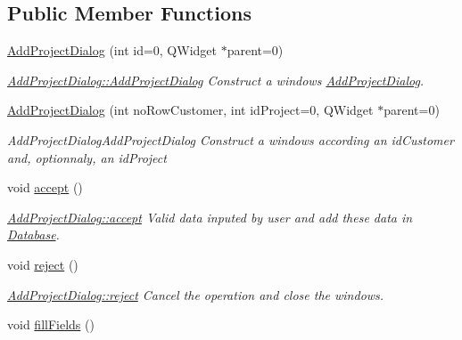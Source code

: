 \subsection*{Public Member Functions}
\begin{DoxyCompactItemize}
\item 
\hyperlink{classAddProjectDialog_abb96542ad074344f634d0ff834e65f03}{Add\+Project\+Dialog} (int id=0, Q\+Widget $\ast$parent=0)
\begin{DoxyCompactList}\small\item\em \hyperlink{classAddProjectDialog_abb96542ad074344f634d0ff834e65f03}{Add\+Project\+Dialog\+::\+Add\+Project\+Dialog} Construct a windows \hyperlink{classAddProjectDialog}{Add\+Project\+Dialog}. \end{DoxyCompactList}\item 
\hyperlink{classAddProjectDialog_a7acdb6d0e61449ad9376802d90162d2c}{Add\+Project\+Dialog} (int no\+Row\+Customer, int id\+Project=0, Q\+Widget $\ast$parent=0)
\begin{DoxyCompactList}\small\item\em Add\+Project\+Dialog\+Add\+Project\+Dialog Construct a windows according an {\itshape id\+Customer} and, optionnaly, an {\itshape id\+Project} \end{DoxyCompactList}\item 
\hypertarget{classAddProjectDialog_adb873176b67a671fc417e7ab21389c21}{void \hyperlink{classAddProjectDialog_adb873176b67a671fc417e7ab21389c21}{accept} ()}\label{classAddProjectDialog_adb873176b67a671fc417e7ab21389c21}

\begin{DoxyCompactList}\small\item\em \hyperlink{classAddProjectDialog_adb873176b67a671fc417e7ab21389c21}{Add\+Project\+Dialog\+::accept} Valid data inputed by user and add these data in \hyperlink{classDatabase}{Database}. \end{DoxyCompactList}\item 
\hypertarget{classAddProjectDialog_a3e6011001312acd234f2352f1a796f0e}{void \hyperlink{classAddProjectDialog_a3e6011001312acd234f2352f1a796f0e}{reject} ()}\label{classAddProjectDialog_a3e6011001312acd234f2352f1a796f0e}

\begin{DoxyCompactList}\small\item\em \hyperlink{classAddProjectDialog_a3e6011001312acd234f2352f1a796f0e}{Add\+Project\+Dialog\+::reject} Cancel the operation and close the windows. \end{DoxyCompactList}\item 
\hypertarget{classAddProjectDialog_ad8c428e08b08a7aa36f7c6801810c0cd}{void \hyperlink{classAddProjectDialog_ad8c428e08b08a7aa36f7c6801810c0cd}{fill\+Fields} ()}\label{classAddProjectDialog_ad8c428e08b08a7aa36f7c6801810c0cd}


\end{DoxyCompactItemize}
